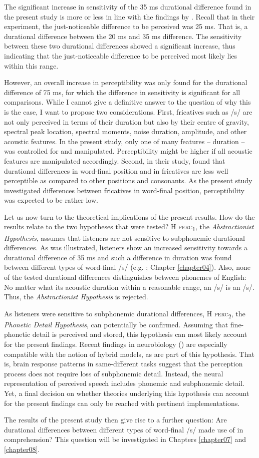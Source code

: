 The significant increase in sensitivity of the 35 ms durational difference found in the present study is more or less in line with the findings by \citet{Klatt1975}. Recall that in their experiment, the just-noticeable difference to be perceived was 25 ms. That is, a durational difference between the 20 ms and 35 ms difference. The sensitivity between these two durational differences showed a significant increase, thus indicating that the just-noticeable difference to be perceived most likely lies within this range.

However, an overall increase in perceptibility was only found for the durational difference of 75 ms, for which the difference in sensitivity is significant for all comparisons. While I cannot give a definitive answer to the question of why this is the case, I want to propose two considerations. First, fricatives such as /s/ are not only perceived in terms of their duration but also by their centre of gravity, spectral peak location, spectral moments, noise duration, amplitude, and other acoustic features. In the present study, only one of many features – duration – was controlled for and manipulated. Perceptibility might be higher if all acoustic features are manipulated accordingly. Second, in their study, \citet{Klatt1975} found that durational differences in word-final position and in fricatives are less well perceptible as compared to other positions and consonants. As the present study investigated differences between fricatives in word-final position, perceptibility was expected to be rather low.

Let us now turn to the theoretical implications of the present results. How do the results relate to the two hypotheses that were tested? \textsc{H perc\textsubscript{1}}, the \textit{Abstractionist Hypothesis}, assumes that listeners are not sensitive to subphonemic durational differences. As was illustrated, listeners show an increased sensitivity towards a durational difference of 35 ms and such a difference in duration was found between different types of word-final /s/ (e.g. \cite{Plag2017}; Chapter \ref{chapter04}). Also, none of the tested durational differences distinguishes between phonemes of English: No matter what its acoustic duration within a reasonable range, an /s/ is an /s/. Thus, the \textit{Abstractionist Hypothesis} is rejected.

As listeners were sensitive to subphonemic durational differences, \textsc{H perc\textsubscript{2}}, the \textit{Phonetic Detail Hypothesis}, can potentially be confirmed. Assuming that fine-phonetic detail is perceived and stored, this hypothesis can most likely account for the present findings. Recent findings in neurobiology (\cite{Beach2021}) are especially compatible with the notion of hybrid models, as are part of this hypothesis. That is, brain response patterns in same-different tasks suggest that the perception process does not require loss of subphonemic detail. Instead, the neural representation of perceived speech includes phonemic and subphonemic detail. Yet, a final decision on whether theories underlying this hypothesis can account for the present findings can only be reached with pertinent implementations.

The results of the present study then give rise to a further question: Are durational differences between different types of word-final /s/ made use of in comprehension? This question will be investigated in Chapters \ref{chapter07} and \ref{chapter08}.
